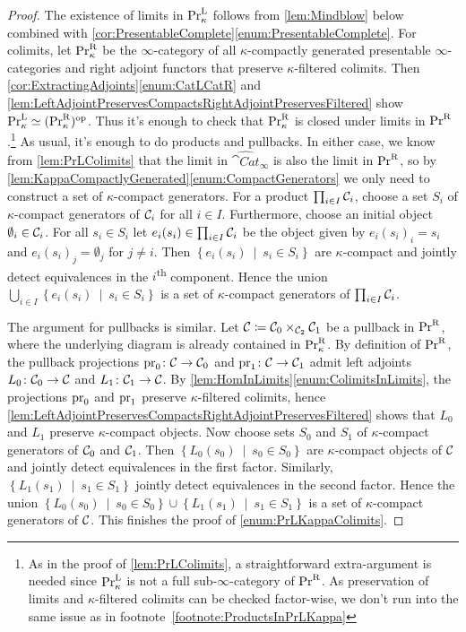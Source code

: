 \begin{proof}
	The existence of limits in $\mathrm{Pr}_\kappa^{\mathrm{L}}$ follows from \cref{lem:Mindblow} below combined with \cref{cor:PresentableComplete}\cref{enum:PresentableComplete}. For colimits, let $\mathrm{Pr}_\kappa^{\mathrm{R}}$ be the $\infty$-category of all $\kappa$-compactly generated presentable $\infty$-categories and right adjoint functors that preserve $\kappa$-filtered colimits. Then \cref{cor:ExtractingAdjoints}\cref{enum:CatLCatR} and \cref{lem:LeftAdjointPreservesCompactsRightAdjointPreservesFiltered} show $\mathrm{Pr}_\kappa^{\mathrm{L}}\simeq (\mathrm{Pr}_\kappa^{\mathrm{R}})^{\mathrm{op}}$. Thus it's enough to check that $\mathrm{Pr}_\kappa^{\mathrm{R}}$ is closed under limits in $\mathrm{Pr}^{\mathrm{R}}$.\footnote{As in the proof of \cref{lem:PrLColimits}, a straightforward extra-argument is needed since $\mathrm{Pr}_\kappa^{\mathrm{L}}$ is not a full sub-$\infty$-category of $\mathrm{Pr}^{\mathrm{R}}$. As preservation of limits and $\kappa$-filtered colimits can be checked factor-wise, we don't run into the same issue as in footnote~\cref{footnote:ProductsInPrLKappa}} As usual, it's enough to do products and pullbacks. In either case, we know from \cref{lem:PrLColimits} that the limit in $\widehat{\cat{Cat}}_\infty$ is also the limit in $\mathrm{Pr}^{\mathrm{R}}$, so by \cref{lem:KappaCompactlyGenerated}\cref{enum:CompactGenerators} we only need to construct a set of $\kappa$-compact generators. For a product $\prod_{i\in I}\mathcal{C}_i$, choose a set $S_i$ of $\kappa$-compact generators of $\mathcal{C}_i$ for all $i\in I$. Furthermore, choose an initial object $\emptyset_i\in \mathcal{C}_i$. For all $s_i\in S_i$ let $e_i(s_i)\in \prod_{i\in I}\mathcal{C}_i$ be the object given by $e_i(s_i)_i=s_i$ and $e_i(s_i)_j=\emptyset_j$ for $j\neq i$. Then $\left\{e_i(s_i)\ \middle|\ s_i\in S_i\right\}$ are $\kappa$-compact and jointly detect equivalences in the $i$\textsuperscript{th} component. Hence the union $\bigcup_{i\in I}\left\{e_i(s_i)\ \middle|\ s_i\in S_i\right\}$ is a set of $\kappa$-compact generators of $\prod_{i\in I}\mathcal{C}_i$.
	
	The argument for pullbacks is similar. Let $\mathcal{C}\coloneqq\mathcal{C}_0\times_{\mathcal{C}_2}\mathcal{C}_1$ be a pullback in $\mathrm{Pr}^{\mathrm{R}}$, where the underlying diagram is already contained in $\mathrm{Pr}_\kappa^{\mathrm{R}}$. By definition of $\mathrm{Pr}^{\mathrm{R}}$, the pullback projections $\operatorname{pr}_0\colon \mathcal{C}\rightarrow \mathcal{C}_0$ and $\operatorname{pr}_1\colon \mathcal{C}\rightarrow \mathcal{C}_1$ admit left adjoints $L_0\colon \mathcal{C}_0\rightarrow\mathcal{C}$ and $L_1\colon \mathcal{C}_1\rightarrow \mathcal{C}$. By \cref{lem:HomInLimits}\cref{enum:ColimitsInLimits}, the projections $\operatorname{pr}_0$ and $\operatorname{pr}_1$ preserve $\kappa$-filtered colimits, hence \cref{lem:LeftAdjointPreservesCompactsRightAdjointPreservesFiltered} shows that $L_0$ and $L_1$ preserve $\kappa$-compact objects. Now choose sets $S_0$ and $S_1$ of $\kappa$-compact generators of $\mathcal{C}_0$ and $\mathcal{C}_1$. Then $\left\{L_0(s_0)\ \middle|\ s_0\in S_0\right\}$ are $\kappa$-compact objects of $\mathcal{C}$ and jointly detect equivalences in the first factor. Similarly, $\left\{L_1(s_1)\ \middle|\ s_1\in S_1\right\}$ jointly detect equivalences in the second factor. Hence the union $\left\{L_0(s_0)\ \middle|\ s_0\in S_0\right\}\cup \left\{L_1(s_1)\ \middle|\ s_1\in S_1\right\}$ is a set of $\kappa$-compact generators of $\mathcal{C}$. This finishes the proof of \cref{enum:PrLKappaColimits}.
\end{proof}

